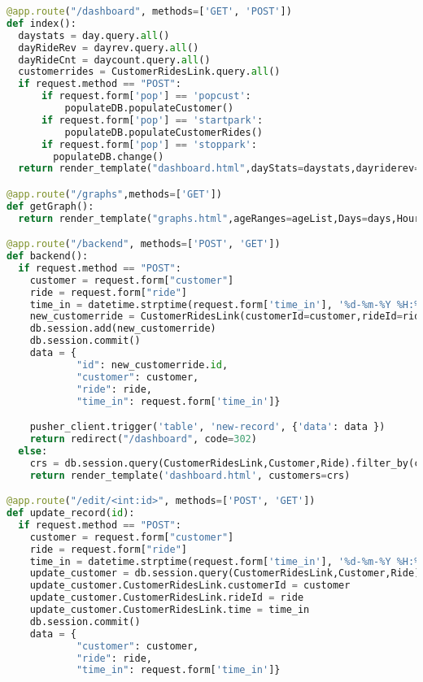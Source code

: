 \begin{lstlisting}[language=Python]
@app.route("/dashboard", methods=['GET', 'POST'])
def index():
  daystats = day.query.all()
  dayRideRev = dayrev.query.all()
  dayRideCnt = daycount.query.all()
  customerrides = CustomerRidesLink.query.all()
  if request.method == "POST":
      if request.form['pop'] == 'popcust':
          populateDB.populateCustomer()
      if request.form['pop'] == 'startpark':
          populateDB.populateCustomerRides()
      if request.form['pop'] == 'stoppark':
        populateDB.change()
  return render_template("dashboard.html",dayStats=daystats,dayriderev=dayRideRev,dayridecnt=dayRideCnt,customerRides=customerrides,ageRanges=ageList,Days=days,Hours=hours,dates=datems,dayRevenue=dayrevenue,dayCount=daycunt,rideDates=ridedates,CR=cr,DRR=drr,DTR=dtr,FWR=fwr,GTR=gtr,RCR=rcr,WRR=wrr,SSR=ssr,CIR=cir,GR=gr,CC=cc,DRC=drc,DTC=dtc,FWC=fwc,GTC=gtc,RCC=rcc,WRC=wrc,SSC=ssc,CIC=cic,GC=gc)

@app.route("/graphs",methods=['GET'])
def getGraph():
  return render_template("graphs.html",ageRanges=ageList,Days=days,Hours=hours,dates=datems,dayRevenue=dayrevenue,dayCount=daycunt,rideDates=ridedates,CR=cr,DRR=drr,DTR=dtr,FWR=fwr,GTR=gtr,RCR=rcr,WRR=wrr,SSR=ssr,CIR=cir,GR=gr,CC=cc,DRC=drc,DTC=dtc,FWC=fwc,GTC=gtc,RCC=rcc,WRC=wrc,SSC=ssc,CIC=cic,GC=gc)

@app.route("/backend", methods=['POST', 'GET'])
def backend():
  if request.method == "POST":
    customer = request.form["customer"]
    ride = request.form["ride"]
    time_in = datetime.strptime(request.form['time_in'], '%d-%m-%Y %H:%M')
    new_customerride = CustomerRidesLink(customerId=customer,rideId=ride,time=time_in)
    db.session.add(new_customerride)
    db.session.commit()
    data = {
            "id": new_customerride.id,
            "customer": customer,
            "ride": ride,
            "time_in": request.form['time_in']}

    pusher_client.trigger('table', 'new-record', {'data': data })
    return redirect("/dashboard", code=302)
  else:
    crs = db.session.query(CustomerRidesLink,Customer,Ride).filter_by(customerId=Customer.id,rideId=Ride.id).all()
    return render_template('dashboard.html', customers=crs)

@app.route("/edit/<int:id>", methods=['POST', 'GET'])
def update_record(id):
  if request.method == "POST":
    customer = request.form["customer"]
    ride = request.form["ride"]
    time_in = datetime.strptime(request.form['time_in'], '%d-%m-%Y %H:%M')
    update_customer = db.session.query(CustomerRidesLink,Customer,Ride).filter_by(id=id,customerId=Customer.id,rideId=Ride.id).first()
    update_customer.CustomerRidesLink.customerId = customer
    update_customer.CustomerRidesLink.rideId = ride
    update_customer.CustomerRidesLink.time = time_in
    db.session.commit()
    data = {
            "customer": customer,
            "ride": ride,
            "time_in": request.form['time_in']}


\end{lstlisting}
